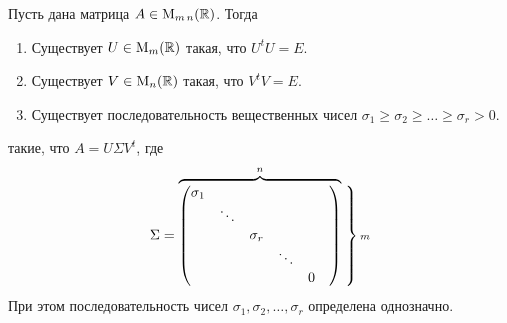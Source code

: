 \begin{claim}
Пусть дана матрица $A\in \operatorname{M}_{m\,n}(\mathbb R)$.
Тогда
\begin{enumerate}
\item Существует $U\in \operatorname{M}_{m}(\mathbb R)$ такая, что $U^t U = E$.

\item Существует $V\in \operatorname{M}_{n}(\mathbb R)$ такая, что $V^t V = E$.

\item Существует последовательность вещественных чисел $\sigma_1\geqslant \sigma_2\geqslant \ldots\geqslant \sigma_r > 0$.
\end{enumerate}
такие, что $A = U \Sigma V^t$, где
\[
\Sigma =
\overbrace{
\begin{pmatrix}
{\sigma_1}&{}&{}&{}&{}&{}\\
{}&{\ddots}&{}&{}&{}&{}\\
{}&{}&{\sigma_r}&{}&{}&{}\\
{}&{}&{}&{\ddots}&{}&{}\\
{}&{}&{}&{}&{0}&{}\\
\end{pmatrix}
}^n
\left.
\vphantom{
\begin{pmatrix}
{\sigma_1}&{}&{}&{}&{}&{}\\
{}&{\ddots}&{}&{}&{}&{}\\
{}&{}&{\sigma_r}&{}&{}&{}\\
{}&{}&{}&{\ddots}&{}&{}\\
{}&{}&{}&{}&{0}&{}\\
\end{pmatrix}
}
\right\}{\scriptstyle m}
\]
При этом последовательность чисел $\sigma_1,\sigma_2,\ldots,\sigma_r$ определена однозначно.
\end{claim}

